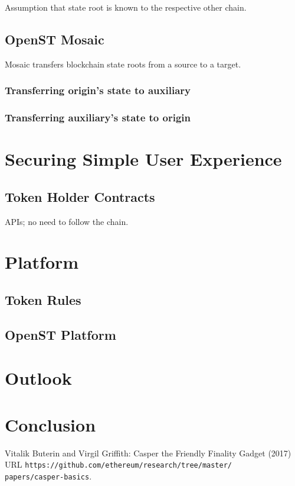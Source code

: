 \documentclass[12pt,a4paper,draft]{article}
\begin{document}
Assumption that state root is known to the respective other chain.

\subsection{OpenST Mosaic}

Mosaic transfers blockchain state roots from a source to a target.

%

\subsubsection{Transferring origin's state to auxiliary}

\subsubsection{Transferring auxiliary's state to origin}

\section{Securing Simple User Experience}

\subsection{Token Holder Contracts}

APIs; no need to follow the chain.

\section{Platform}

\subsection{Token Rules}

\subsection{OpenST Platform}

\section{Outlook}

\section{Conclusion}

\begin{thebibliography}{9}

  Vitalik Buterin and Virgil Griffith:
  Casper the Friendly Finality Gadget (2017)\\
  URL \texttt{https://github.com/ethereum/research/tree/master/\\papers/casper-basics}.

\end{thebibliography}
\end{document}
